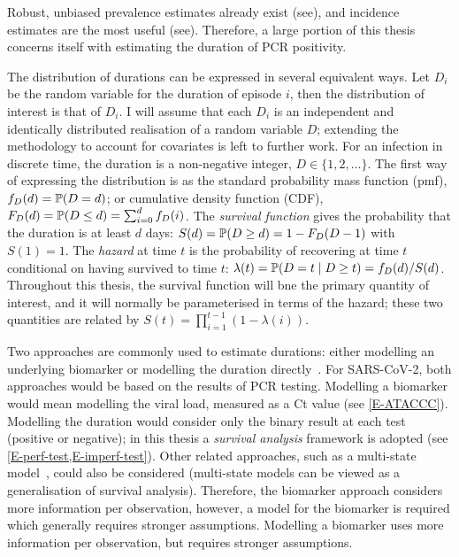 \documentclass[thesis.tex]{subfiles}
\begin{document}

Robust, unbiased prevalence estimates already exist (see), and incidence estimates are the most useful (see).
Therefore, a large portion of this thesis concerns itself with estimating the duration of PCR positivity.

The distribution of durations can be expressed in several equivalent ways.
Let $D_i$ be the random variable for the duration of episode $i$, then the distribution of interest is that of $D_i$.
I will assume that each $D_i$ is an independent and identically distributed realisation of a random variable $D$; extending the methodology to account for covariates is left to further work.
For an infection in discrete time, the duration is a non-negative integer, \ie $D \in \{1, 2, \dots\}$.
The first way of expressing the distribution is as the standard probability mass function (pmf), $f_{D}(d) = \operatorname{\mathbb{P}}(D = d)$; or cumulative density function (CDF), $F_{D}(d) = \operatorname{\mathbb{P}}(D \leq d) = \sum_{i=0}^d f_{D}(i)$.
The \emph{survival function} gives the probability that the duration is at least $d$ days: $S(d) = \operatorname{\mathbb{P}}(D \geq d) = 1 - F_{D}(D - 1)$ with $S(1) = 1$.
The \emph{hazard} at time $t$ is the probability of recovering at time $t$ conditional on having survived to time $t$: $\lambda(t) = \operatorname{\mathbb{P}}(D = t \mid D \geq t) = f_{D}(d) / S(d)$.
Throughout this thesis, the survival function will bne the primary quantity of interest, and it will normally be parameterised in terms of the hazard; these two quantities are related by $S(t) = \prod_{i=1}^{t-1} (1 - \lambda(i))$.

Two approaches are commonly used to estimate durations: either modelling an underlying biomarker or modelling the duration directly~\autocite{sweetingEstimating}.
For SARS-CoV-2, both approaches would be based on the results of PCR testing.
Modelling a biomarker would mean modelling the viral load, measured as a Ct value (see \cref{E-ATACCC}).
Modelling the duration would consider only the binary result at each test (positive or negative); in this thesis a \emph{survival analysis} framework is adopted (see \cref{E-perf-test,E-imperf-test}).
Other related approaches, such as a multi-state model~\autocite{jacksonMSM}, could also be considered (multi-state models can be viewed as a generalisation of survival analysis).
Therefore, the biomarker approach considers more information per observation, however, a model for the biomarker is required which generally requires stronger assumptions.
Modelling a biomarker uses more information per observation, but requires stronger assumptions.
\end{document}
